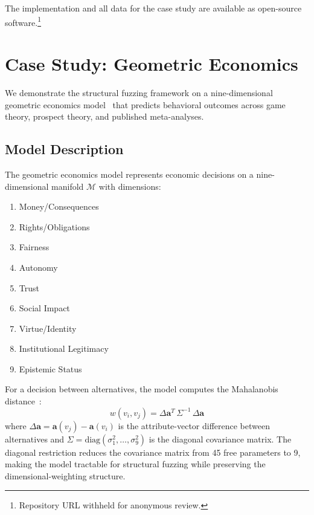 \documentclass[manuscript,review,anonymous]{acmart}
\begin{document}
The implementation and all data for the case study are available as open-source software.\footnote{Repository URL withheld for anonymous review.}


\section{Case Study: Geometric Economics}
\label{sec:case_study}

We demonstrate the structural fuzzing framework on a nine-dimensional geometric economics model~\cite{bond2026b} that predicts behavioral outcomes across game theory, prospect theory, and published meta-analyses.

\subsection{Model Description}

The geometric economics model represents economic decisions on a nine-dimensional manifold $\mathcal{M}$ with dimensions:
\begin{enumerate}
    \item[$d_1$:] Money/Consequences
    \item[$d_2$:] Rights/Obligations
    \item[$d_3$:] Fairness
    \item[$d_4$:] Autonomy
    \item[$d_5$:] Trust
    \item[$d_6$:] Social Impact
    \item[$d_7$:] Virtue/Identity
    \item[$d_8$:] Institutional Legitimacy
    \item[$d_9$:] Epistemic Status
\end{enumerate}

For a decision between alternatives, the model computes the Mahalanobis distance~\cite{mahalanobis1936}:
\begin{equation}
    w(v_i, v_j) = \Delta \mathbf{a}^T \, \Sigma^{-1} \, \Delta \mathbf{a}
    \label{eq:mahal}
\end{equation}
where $\Delta \mathbf{a} = \mathbf{a}(v_j) - \mathbf{a}(v_i)$ is the attribute-vector difference between alternatives and $\Sigma = \mathrm{diag}(\sigma_1^2, \ldots, \sigma_9^2)$ is the diagonal covariance matrix.
The diagonal restriction reduces the covariance matrix from 45 free parameters to 9, making the model tractable for structural fuzzing while preserving the dimensional-weighting structure.
\end{document}
